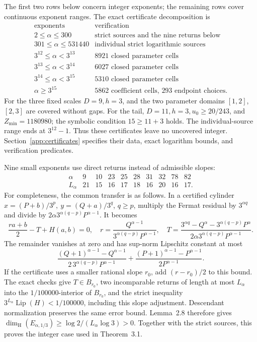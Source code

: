 \documentclass[11pt,a4paper]{article}
\begin{document}
The first two rows below concern integer exponents; the remaining rows cover continuous exponent ranges. The exact certificate decomposition is
\[
\begin{array}{c|l}
\text{exponents}&\text{verification}\\ \hline
2\leq \alpha\leq300&\text{strict sources and the nine returns below}\\
301\leq \alpha\leq531440&\text{individual strict logarithmic sources}\\
3^{12}\leq \alpha<3^{13}&8921\text{ closed parameter cells}\\
3^{13}\leq \alpha<3^{14}&6027\text{ closed parameter cells}\\
3^{14}\leq \alpha<3^{15}&5310\text{ closed parameter cells}\\
\alpha\geq3^{15}&5862\text{ coefficient cells, }293\text{ endpoint choices}.
\end{array}
\]
For the three fixed scales \(D=9,h=3\), and the two parameter
domains \([1,2]\), \([2,3]\) are covered without gaps.
For the tail, \(D=11,h=3,u_0\geq20/243\), and
\(Z_{\min}=1180980\); the symbolic condition \(15\geq11+3\)
holds. The individual-source range ends at \(3^{12}-1\).
Thus these certificates leave no uncovered integer.
Section~\ref{app:certificates} specifies their data, exact
logarithm bounds, and verification predicates.

Nine small exponents use direct returns instead of admissible
slopes:
\[
\begin{array}{c|rrrrrrrrr}
\alpha&9&10&23&25&28&31&32&78&82\\ \hline
L_\alpha&21&15&16&17&18&16&20&16&17 .
\end{array}
\]
For completeness, the common transfer is as follows. In a
certified cylinder \(x=(P+b)/3^p,\ y=(Q+a)/3^q\), \(q\geq p\),
multiply the Fermat residual by \(3^{\alpha q}\) and divide by
\(2\alpha3^{\alpha(q-p)}P^{\alpha-1}\). It becomes
\[
\frac{ra+b}{2}-T+H(a,b)=0,\quad
r=\frac{Q^{\alpha-1}}{3^{\alpha(q-p)}P^{\alpha-1}},\quad
T=\frac{3^{\alpha q}-Q^\alpha-3^{\alpha(q-p)}P^\alpha}
         {2\alpha3^{\alpha(q-p)}P^{\alpha-1}}.
\]
The remainder vanishes at zero and has sup-norm Lipschitz constant
at most
\[
\frac{(Q+1)^{\alpha-1}-Q^{\alpha-1}}{2\,3^{\alpha(q-p)}P^{\alpha-1}}
+\frac{(P+1)^{\alpha-1}-P^{\alpha-1}}{2P^{\alpha-1}}.
\]
If the certificate uses a smaller rational slope \(r_0\), add
\((r-r_0)/2\) to this bound. The exact checks give \(T\in B_{r_0}\),
two incomparable returns of length at most \(L_\alpha\) into the
\(1/100000\)-interior of \(B_{r_0}\), and the strict inequality
\(3^{L_\alpha}\operatorname{Lip}(H)<1/100000\), including this slope
adjustment. Descendant normalization preserves the same error
bound. Lemma~2.8 therefore gives
\(\dim_{\mathrm H}(E_{\alpha,1/3})\geq\log2/(L_\alpha\log3)>0\).
Together with the strict sources, this proves the integer case used in Theorem~3.1.
\end{document}
